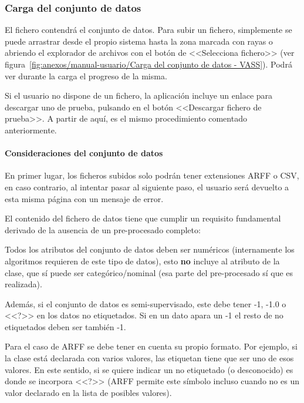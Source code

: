 \subsubsection{Carga del conjunto de datos}

El fichero contendrá el conjunto de datos. Para subir un fichero, simplemente se
puede arrastrar desde el propio sistema hasta la zona marcada con rayas o
abriendo el explorador de archivos con el botón de <<Selecciona fichero>> (ver
figura~\ref{fig:anexos/manual-usuario/Carga del conjunto de datos - VASS}).
Podrá ver durante la carga el progreso de la misma.

Si el usuario no dispone de un fichero, la aplicación incluye un enlace para
descargar uno de prueba, pulsando en el botón <<Descargar fichero de prueba>>. A
partir de aquí, es el mismo procedimiento comentado anteriormente.


\paragraph{Consideraciones del conjunto de datos} En primer lugar, los ficheros
subidos solo podrán tener extensiones ARFF o CSV, en caso contrario, al intentar
pasar al siguiente paso, el usuario será devuelto a esta misma página con un
mensaje de error.

El contenido del fichero de datos tiene que cumplir un requisito fundamental
derivado de la ausencia de un pre-procesado completo: 

\begin{tcolorbox}[colback=red!5!white,colframe=red!75!black,fontupper=\footnotesize,title=Requisito fundamental]
Todos los atributos del conjunto de datos deben ser numéricos (internamente los
algoritmos requieren de este tipo de datos), esto \textbf{no} incluye al
atributo de la clase, que sí puede ser categórico/nominal (esa parte del
pre-procesado sí que es realizada).
\end{tcolorbox}

Además, si el conjunto de datos es semi-supervisado, este debe tener -1, -1.0 o
<<?>> en los datos no etiquetados. Si en un dato apara un -1 el resto de no
etiquetados deben ser también -1.

Para el caso de ARFF se debe tener en cuenta su propio formato. Por ejemplo, si
la clase está declarada con varios valores, las etiquetan tiene que ser uno de
esos valores. En este sentido, si se quiere indicar un no etiquetado (o
desconocido) es donde se incorpora <<?>> (ARFF permite este símbolo incluso
cuando no es un valor declarado en la lista de posibles valores).

